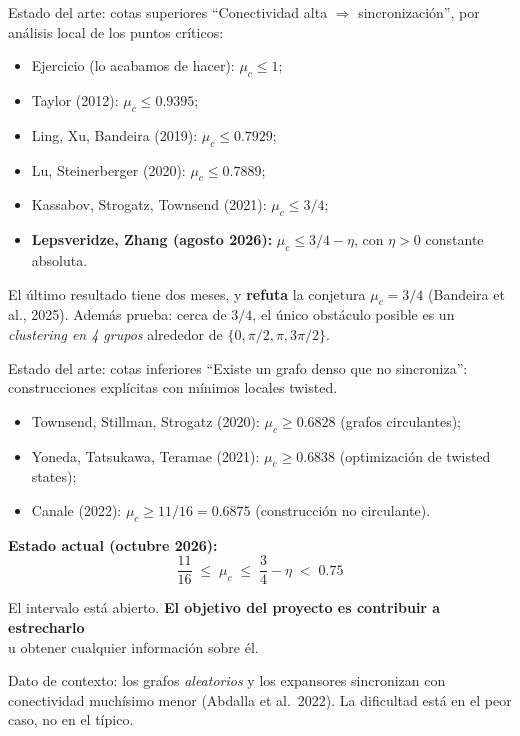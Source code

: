 \documentclass[10pt,aspectratio=169]{beamer}
\begin{document}
\begin{frame}{Estado del arte: cotas superiores}
``Conectividad alta $\Rightarrow$ sincronización'', por análisis local de los puntos críticos:
\medskip
\begin{itemize}
    \item Ejercicio (lo acabamos de hacer): $\mu_c \le 1$;
    \item Taylor (2012): $\mu_c \le 0{.}9395$;
    \item Ling, Xu, Bandeira (2019): $\mu_c \le 0{.}7929$;
    \item Lu, Steinerberger (2020): $\mu_c \le 0{.}7889$;
    \item Kassabov, Strogatz, Townsend (2021): $\mu_c \le 3/4$;
    \item \textbf{Lepsveridze, Zhang (agosto 2026):} $\mu_c \le 3/4 - \eta$, con $\eta > 0$ constante absoluta.
\end{itemize}
\medskip
\pause
El último resultado tiene dos meses, y \textbf{refuta} la conjetura $\mu_c = 3/4$ (Bandeira et al., 2025). Además prueba: cerca de $3/4$, el único obstáculo posible es un \emph{clustering en 4 grupos} alrededor de $\{0, \pi/2, \pi, 3\pi/2\}$.
\end{frame}

\begin{frame}{Estado del arte: cotas inferiores}
``Existe un grafo denso que no sincroniza'': construcciones explícitas con mínimos locales twisted.
\medskip
\begin{itemize}
    \item Townsend, Stillman, Strogatz (2020): $\mu_c \ge 0{.}6828$ (grafos circulantes);
    \item Yoneda, Tatsukawa, Teramae (2021): $\mu_c \ge 0{.}6838$ (optimización de twisted states);
    \item Canale (2022): $\mu_c \ge 11/16 = 0{.}6875$ (construcción no circulante).
\end{itemize}
\pause
\medskip
\textbf{Estado actual (octubre 2026):}
\[
\boxed{\;\frac{11}{16} \;\le\; \mu_c \;\le\; \frac34 - \eta \;<\; 0{.}75\;}
\]
\begin{center}
El intervalo está abierto. \textbf{El objetivo del proyecto es contribuir a estrecharlo}\\ u obtener cualquier información sobre él.
\end{center}
\pause
Dato de contexto: los grafos \emph{aleatorios} y los expansores sincronizan con conectividad muchísimo menor (Abdalla et al.\ 2022). La dificultad está en el peor caso, no en el típico.
\end{frame}
\end{document}

